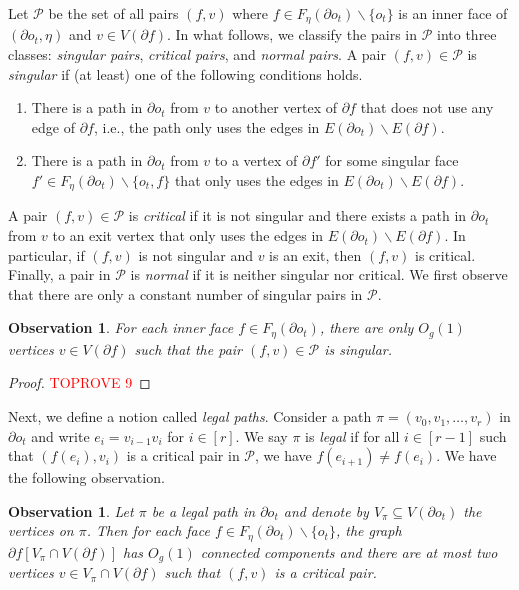 \documentclass[a4paper,11pt]{article}
\numberwithin{lemma}{section}
\newtheorem{observation}[lemma]{Observation}
\begin{document}
Let $\mathcal{P}$ be the set of all pairs $(f,v)$ where $f \in F_\eta(\partial o_t) \backslash \{o_t\}$ is an inner face of $(\partial o_t, \eta)$ and $v \in V(\partial f)$.
In what follows, we classify the pairs in $\mathcal{P}$ into three classes: \textit{singular pairs}, \textit{critical pairs}, and \textit{normal pairs}.
A pair $(f,v) \in \mathcal{P}$ is \textit{singular} if (at least) one of the following conditions holds.
\begin{enumerate}[label = (\roman*)]
 \item There is a path in $\partial o_t$ from $v$ to another vertex of $\partial f$ that does not use any edge of $\partial f$, i.e., the path only uses the edges in $E(\partial o_t) \backslash E(\partial f)$.
 \item There is a path in $\partial o_t$ from $v$ to a vertex of $\partial f'$ for some singular face $f' \in F_\eta(\partial o_t) \backslash \{o_t,f\}$ that only uses the edges in $E(\partial o_t) \backslash E(\partial f)$.
\end{enumerate}
A pair $(f,v) \in \mathcal{P}$ is \textit{critical} if it is not singular and there exists a path in $\partial o_t$ from $v$ to an exit vertex that only uses the edges in $E(\partial o_t) \backslash E(\partial f)$.
In particular, if $(f,v)$ is not singular and $v$ is an exit, then $(f,v)$ is critical.
Finally, a pair in $\mathcal{P}$ is \textit{normal} if it is neither singular nor critical.
We first observe that there are only a constant number of singular pairs in $\mathcal{P}$.

\begin{observation} \label{obs-O1singular}
For each inner face $f \in F_\eta(\partial o_t)$, there are only $O_g(1)$ vertices $v \in V(\partial f)$ such that the pair $(f,v) \in \mathcal{P}$ is singular.
\end{observation}
\begin{proof}\textcolor{red}{TOPROVE 9}\end{proof}

Next, we define a notion called \textit{legal paths}.
Consider a path $\pi = (v_0,v_1,\dots,v_r)$ in $\partial o_t$ and write $e_i = v_{i-1}v_i$ for $i \in [r]$.
We say $\pi$ is \textit{legal} if for all $i \in [r-1]$ such that $(f(e_i),v_i)$ is a critical pair in $\mathcal{P}$, we have $f(e_{i+1}) \neq f(e_i)$.
We have the following observation.

\begin{observation}\label{obs-legal}
Let $\pi$ be a legal path in $\partial o_t$ and denote by $V_\pi \subseteq V(\partial o_t)$ the vertices on $\pi$.
Then for each face $f \in F_\eta(\partial o_t) \backslash \{o_t\}$, the graph $\partial f [V_\pi \cap V(\partial f)]$ has $O_g(1)$ connected components and there are at most two vertices $v \in V_\pi \cap V(\partial f)$ such that $(f,v)$ is a critical pair.
\end{observation}
\end{document}
